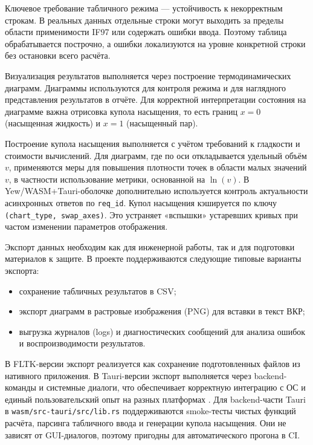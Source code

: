 Ключевое требование табличного режима --- устойчивость к некорректным строкам.  
В реальных данных отдельные строки могут выходить за пределы области применимости IF97 или содержать ошибки ввода.  
Поэтому таблица обрабатывается построчно,
а ошибки локализуются на уровне конкретной строки без остановки всего расчёта.  

Визуализация результатов выполняется через построение термодинамических диаграмм.  
Диаграммы используются для контроля режима и для наглядного представления результатов в отчёте.  
Для корректной интерпретации состояния на диаграмме важна отрисовка купола насыщения,
то есть границ $x=0$ (насыщенная жидкость) и $x=1$ (насыщенный пар).  

Построение купола насыщения выполняется с учётом требований к гладкости и стоимости вычислений.  
Для диаграмм, где по оси откладывается удельный объём $v$,
применяются меры для повышения плотности точек в области малых значений $v$,
в частности использование метрики, основанной на $\ln(v)$.  
В Yew/WASM+Tauri-оболочке дополнительно используется
контроль актуальности асинхронных ответов по \texttt{req\_id}.
Купол насыщения кэшируется по ключу \texttt{(chart\_type, swap\_axes)}.
Это устраняет «вспышки» устаревших кривых
при частом изменении параметров отображения.  

Экспорт данных необходим как для инженерной работы, так и для подготовки материалов к защите.  
В проекте поддерживаются следующие типовые варианты экспорта:
\begin{itemize}
\item сохранение табличных результатов в CSV;  
\item экспорт диаграмм в растровые изображения (PNG) для вставки в текст ВКР;  
\item выгрузка журналов (logs) и диагностических сообщений для анализа ошибок и воспроизводимости результатов.  
\end{itemize}

В FLTK-версии экспорт реализуется как сохранение подготовленных файлов из нативного приложения.  
В Tauri-версии экспорт выполняется через backend-команды и системные диалоги,
что обеспечивает корректную интеграцию с ОС и единый пользовательский опыт на разных платформах \cite{tauri_docs}.  
Для backend-части Tauri
в \texttt{wasm/src-tauri/src/lib.rs}
поддерживаются smoke-тесты
чистых функций расчёта, парсинга табличного ввода
и генерации купола насыщения.
Они не зависят от GUI-диалогов,
поэтому пригодны для автоматического прогона в CI.

